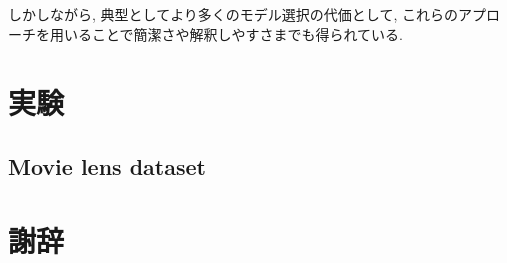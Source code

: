 \documentclass[a4paper]{jarticle}
\begin{document}
しかしながら, 典型としてより多くのモデル選択の代価として, これらのアプローチを用いることで簡潔さや解釈しやすさまでも得られている.  


\section{実験}

\subsection{Movie lens dataset}



\section{謝辞}



\newpage
{} %




\end{document}
